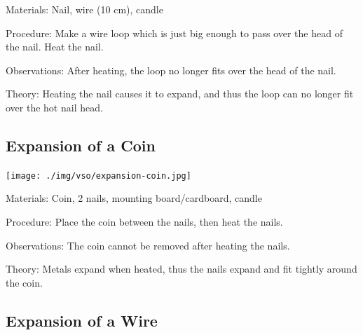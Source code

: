 \begin{multicols}{2}
\begin{description*}
\item[Materials:]{Nail, wire (10 cm), candle}
\item[Procedure:]{Make a wire loop which is just big enough to pass over the head of the nail. Heat the nail.}
\item[Observations:]{After heating, the loop no longer fits over the head of the nail.}
\item[Theory:]{Heating the nail causes it to expand, and thus the loop can no longer fit over the hot nail head.}
\end{description*}

\subsection{Expansion of a Coin}

\begin{center}
\texttt{[image: ./img/vso/expansion-coin.jpg]}
\end{center}

\begin{description*}
\item[Materials:]{Coin, 2 nails, mounting board/cardboard, candle}
\item[Procedure:]{Place the coin between the nails, then heat the nails.}
\item[Observations:]{The coin cannot be removed after heating the nails.}
\item[Theory:]{Metals expand when heated, thus the nails expand and fit tightly around the coin.}
\end{description*}

\subsection{Expansion of a Wire}


\end{multicols}
